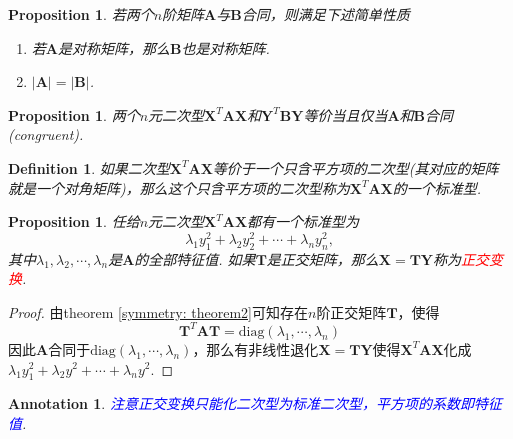 \documentclass{article}
\newtheorem{proposition}[theorem]{Proposition}
\newtheorem{definition}[theorem]{Definition}
\newtheorem{annotation}[theorem]{Annotation}
\newcommand{\mbf}[1]{\bm{#1}}
\newcommand{\redt}[1]{\textcolor{red}{#1}}
\newcommand{\bluet}[1]{\textcolor{blue}{#1}}
\begin{document}
\begin{proposition}
\rm 若两个$n$阶矩阵$\mbf{A}$与$\mbf{B}$合同，则满足下述简单性质
\begin{enumerate}
	\item 若$\mbf{A}$是对称矩阵，那么$\mbf{B}$也是对称矩阵. 
	\item $|\mbf{A}| = |\mbf{B}|$. 
\end{enumerate}
\end{proposition}


\begin{proposition}
\rm 两个$n$元二次型$\mbf{X}^T\mbf{A}\mbf{X}$和$\mbf{Y}^T\mbf{B}\mbf{Y}$等价当且仅当$\mbf{A}$和$\mbf{B}$合同(congruent).
\end{proposition}

\begin{definition}
\rm 如果二次型$\mbf{X}^T\mbf{A}\mbf{X}$等价于一个只含平方项的二次型(其对应的矩阵就是一个对角矩阵)，那么这个只含平方项的二次型称为$\mbf{X}^T\mbf{A}\mbf{X}$的一个{\color{red}标准型}.
\end{definition}

\begin{proposition}
\rm 任给$n$元二次型$\mbf{X}^T\mbf{A}\mbf{X}$都有一个标准型为
$$
\lambda_1y_1^2 + \lambda_2y_2^2 + \cdots + \lambda_n y_n^2,
$$
其中$\lambda_1,\lambda_2,\cdots,\lambda_n$是$\mbf{A}$的全部特征值. 如果$\mbf{T}$是正交矩阵，那么$\mbf{X} = \mbf{T}\mbf{Y}$称为\redt{正交变换}.
\end{proposition}

\begin{proof}
由theorem \ref{symmetry: theorem2}可知存在$n$阶正交矩阵$\mbf{T}$，使得
$$
\mbf{T}^T\mbf{A}\mbf{T} = \text{diag}(\lambda_1,\cdots,\lambda_n)
$$
因此$\mbf{A}$合同于$\text{diag}(\lambda_1,\cdots,\lambda_n)$，那么有非线性退化$\mbf{X} = \mbf{T}\mbf{Y}$使得$\mbf{X}^T\mbf{A}\mbf{X}$化成$\lambda_1y_1^2 + \lambda_2y^2 + \cdots + \lambda_n y^2$. 
\end{proof}

\begin{annotation}
\rm  \bluet{注意正交变换只能化二次型为标准二次型，平方项的系数即特征值}.
\end{annotation}
\end{document}
